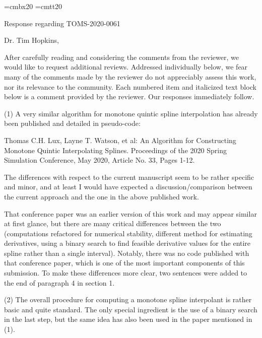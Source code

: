 
\parindent=0pt
\parskip=9pt

\font\titlebf=cmbx20
\font\titlett=cmtt20

{\titlebf Response regarding {\titlett TOMS-2020-0061} \bigskip}

Dr. Tim Hopkins,

After carefully reading and considering the comments from the reviewer, we would like to request additional reviews. Addressed individually below, we fear many of the comments made by the reviewer do not appreciably assess this work, nor its relevance to the community. Each numbered item and italicized text block below is a comment provided by the reviewer. Our responses immediately follow.

{\parindent=20pt \it

\item{(1)} A very similar algorithm for monotone quintic spline interpolation has already been published and detailed in pseudo-code:

\itemitem{} Thomas C.H. Lux, Layne T. Watson, et al: An Algorithm for Constructing Monotone Quintic Interpolating Splines. Proceedings of the 2020 Spring Simulation Conference, May 2020, Article No. 33, Pages 1-12.

\item{} The differences with respect to the current manuscript seem to be rather specific and minor, and at least I would have expected a discussion/comparison between the current approach and the one in the above published work.

}

That conference paper was an earlier version of this work and may appear similar at first glance, but there are many critical differences between the two (computations refactored for numerical stability, different method for estimating derivatives, using a binary search to find feasible derivative values for the entire spline rather than a single interval). Notably, there was no code published with that conference paper, which is one of the most important components of this submission. To make these differences more clear, two sentences were added to the end of paragraph 4 in section 1.

{\parindent=20pt \it

\item{(2)} The overall procedure for computing a monotone spline interpolant is rather basic and quite standard. The only special ingredient is the use of a binary search in the last step, but the same idea has also been used in the paper mentioned in (1).

}

